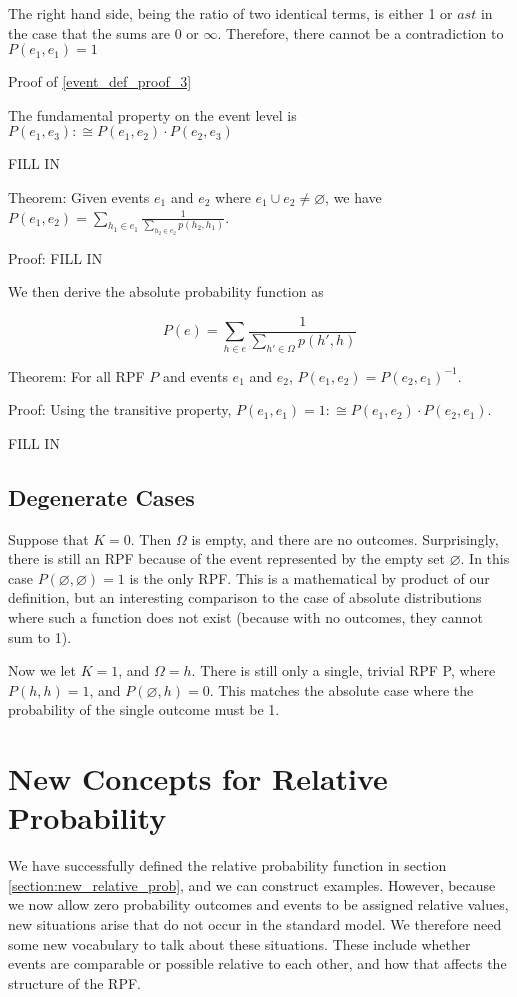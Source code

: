 \documentclass[twoside]{article}
\theoremstyle{plain}%
\theoremstyle{definition}
\theoremstyle{remark}
\begin{document}
The right hand side, being the ratio of two identical terms, is either 1 or \(ast\) in the case that the sums are \(0\) or \(\infty\). Therefore, there cannot be a contradiction to \(P(e_1, e_1) = 1\)

Proof of \ref{event_def_proof_3}

The fundamental property on the event level is \(P(e_1, e_3) :\cong P(e_1, e_2) \cdot P(e_2, e_3)\)

FILL IN

Theorem: Given events \(e_1\) and \(e_2\) where \(e_1 \cup e_2 \neq \varnothing\), we have \(P(e_1, e_2) = \sum_{h_1 \in e_1} \frac{1}{\sum_{h_2 \in e_2} p(h_2, h_1)}\).

Proof: FILL IN

We then derive the absolute probability function as

\[P(e) = \sum_{h \in e} \frac{1}{\sum_{h' \in \Omega}p(h', h)}\]

Theorem: For all RPF \(P\) and events \(e_1\) and \(e_2\), \(P(e_1, e_2) = P(e_2, e_1)^{-1}\).

Proof: Using the transitive property, \(P(e_1, e_1) = 1 :\cong P(e_1, e_2) \cdot P(e_2, e_1)\).

FILL IN

\subsection{Degenerate Cases}

Suppose that \(K = 0\). Then \(\Omega\) is empty, and there are no outcomes. Surprisingly, there is still an RPF because of the event represented by the empty set \(\varnothing\). In this case \(P(\varnothing, \varnothing) = 1\) is the only RPF. This is a mathematical by product of our definition, but an interesting comparison to the case of absolute distributions where such a function does not exist (because with no outcomes, they cannot sum to 1).

Now we let \(K = 1\), and \(\Omega = {h}\). There is still only a single, trivial RPF P, where \(P(h, h) = 1\), and \(P(\varnothing, h) = 0\). This matches the absolute case where the probability of the single outcome must be 1.

\section{New Concepts for Relative Probability}

We have successfully defined the relative probability function in section \ref{section:new_relative_prob}, and we can construct examples. However, because we now allow zero probability outcomes and events to be assigned relative values, new situations arise that do not occur in the standard model. We therefore need some new vocabulary to talk about these situations. These include whether events are comparable or possible relative to each other, and how that affects the structure of the RPF.
\end{document}
